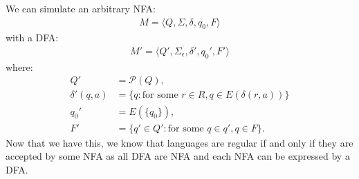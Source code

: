 We can simulate an arbitrary NFA: \begin{gather*}
    M =  \langle Q, \Sigma, \delta, q_0, F \rangle
\end{gather*}
with a DFA: \begin{gather*}
    M' = \langle Q', \Sigma_\epsilon, \delta', q_0', F' \rangle
\end{gather*} where: \begin{align*}
    Q'   &= \mathcal{P}(Q), \\
    \delta'(q, a) &= \{q : \text{for some }
        r \in R, q \in E(\delta(r, a))
    \} \\
    q_0' &= E(\{q_0\}), \\
    F'   &= \{q' \in Q' : \text{for some } q \in q', q \in F\}.
\end{align*} Now that we have this, we know that languages are
regular if and only if they are accepted by some NFA as
all DFA are NFA and each NFA can be expressed by a DFA.
